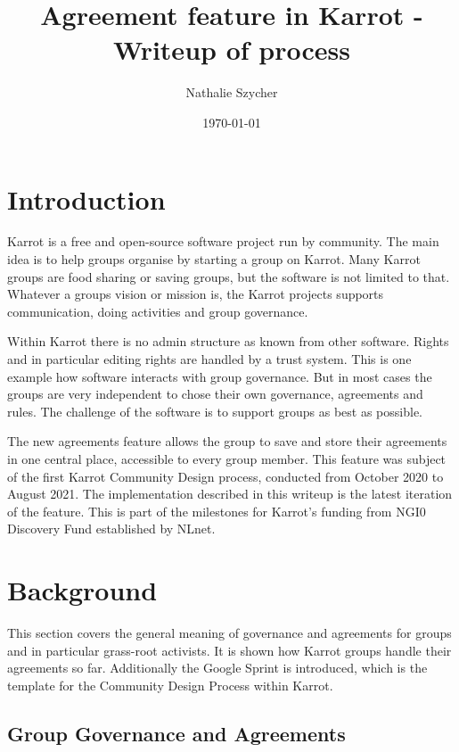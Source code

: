 \documentclass[
	a4paper,%
	11pt,%
	]{article}
\begin{document}
\title{Agreement feature in Karrot - Writeup of process}

\author{Nathalie Szycher}
\date{\today}

\maketitle
\tableofcontents


\section{Introduction}

Karrot is a free and open-source software project run by community. The main idea is to help groups organise by starting a group on Karrot. Many Karrot groups are food sharing or saving groups, but the software is not limited to that. Whatever a groups vision or mission is, the Karrot projects supports communication, doing activities and group governance.

Within Karrot there is no admin structure as known from other software. Rights and in particular editing rights are handled by a trust system. This is one example how software interacts with group governance. But in most cases the groups are very independent to chose their own governance, agreements and rules. The challenge of the software is to support groups as best as possible.

The new agreements feature allows the group to save and store their agreements in one central place, accessible to every group member. This feature was subject of the first Karrot Community Design process, conducted from October 2020 to August 2021. The implementation described in this writeup is the latest iteration of the feature. This is part of the milestones for Karrot's funding from NGI0 Discovery Fund established by NLnet.



\section{Background}

This section covers the general meaning of governance and agreements for groups and in particular grass-root activists. It is shown how Karrot groups handle their agreements so far. Additionally the Google Sprint is introduced, which is the template for the Community Design Process within Karrot.

\subsection{Group Governance and Agreements}
\end{document}

